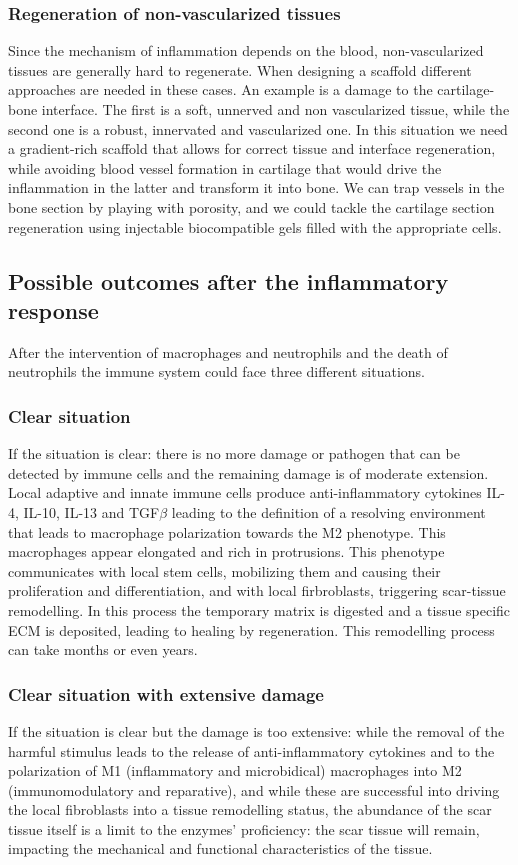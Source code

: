		\subsubsection{Regeneration of non-vascularized tissues}
		Since the mechanism of inflammation depends on the blood, non-vascularized tissues are generally hard to regenerate.
		When designing a scaffold different approaches are needed in these cases.
		An example is a damage to the cartilage-bone interface.
		The first is a soft, unnerved and non vascularized tissue, while the second one is a robust, innervated and vascularized one.
		In this situation we need a gradient-rich scaffold that allows for correct tissue and interface regeneration, while avoiding blood vessel formation in cartilage that would drive the inflammation in the latter and transform it into bone.
		We can trap vessels in the bone section by playing with porosity, and we could tackle the cartilage section regeneration using injectable biocompatible gels filled with the appropriate cells.

	\subsection{Possible outcomes after the inflammatory response}
	After the intervention of macrophages and neutrophils and the death of neutrophils the immune system could face three different situations.

		\subsubsection{Clear situation}
		If the situation is clear: there is no more damage or pathogen that can be detected by immune cells and the remaining damage is of moderate extension.
		Local adaptive and innate immune cells produce anti-inflammatory cytokines IL-4, IL-10, IL-13 and TGF$\beta$ leading to the definition of a resolving environment that leads to macrophage polarization towards the M2 phenotype.
		This macrophages appear elongated and rich in protrusions.
		This phenotype communicates with local stem cells, mobilizing them and causing their proliferation and differentiation, and with local firbroblasts, triggering scar-tissue remodelling.
		In this process the temporary matrix is digested and a tissue specific ECM is deposited, leading to healing by regeneration.
		This remodelling process can take months or even years.

		\subsubsection{Clear situation with extensive damage}
		If the situation is clear but the damage is too extensive: while the removal of the harmful stimulus leads to the release of anti-inflammatory cytokines and to the polarization of M1 (inflammatory and microbidical) macrophages into M2 (immunomodulatory and reparative), and while these are successful into driving the local fibroblasts into a tissue remodelling status, the abundance of the scar tissue itself is a limit to the enzymes’ proficiency: the scar tissue will remain, impacting the mechanical and functional characteristics of the tissue.

